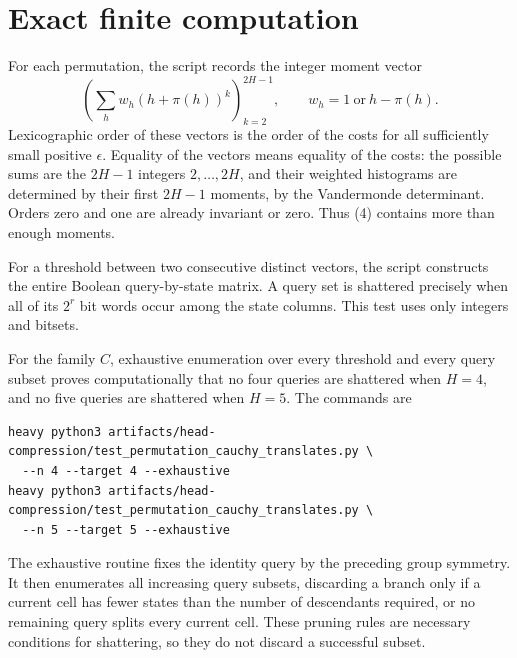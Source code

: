 \documentclass[11pt]{article}
\begin{document}
\section{Exact finite computation}
For each permutation, the script records the integer moment vector
\[
 \left(\sum_h w_h(h+\pi(h))^k\right)_{k=2}^{2H-1},
 \qquad
 w_h=1\ \text{or}\ h-\pi(h).
                                                        \tag{4}
\]
Lexicographic order of these vectors is the order of the costs for
all sufficiently small positive $\epsilon$. Equality of the vectors
means equality of the costs: the possible sums are the $2H-1$
integers $2,\ldots,2H$, and their weighted histograms are determined
by their first $2H-1$ moments, by the Vandermonde determinant.
Orders zero and one are already invariant or zero. Thus (4)
contains more than enough moments.

For a threshold between two consecutive distinct vectors, the
script constructs the entire Boolean query-by-state matrix. A query
set is shattered precisely when all of its $2^r$ bit words occur
among the state columns. This test uses only integers and bitsets.

For the family $C$, exhaustive enumeration over every threshold and
every query subset proves computationally that no four queries are
shattered when $H=4$, and no five queries are shattered when $H=5$.
The commands are
\begin{verbatim}
heavy python3 artifacts/head-compression/test_permutation_cauchy_translates.py \
  --n 4 --target 4 --exhaustive
heavy python3 artifacts/head-compression/test_permutation_cauchy_translates.py \
  --n 5 --target 5 --exhaustive
\end{verbatim}
The exhaustive routine fixes the identity query by the preceding
group symmetry. It then enumerates all increasing query subsets,
discarding a branch only if a current cell has fewer states than
the number of descendants required, or no remaining query splits
every current cell. These pruning rules are necessary conditions
for shattering, so they do not discard a successful subset.
\end{document}

